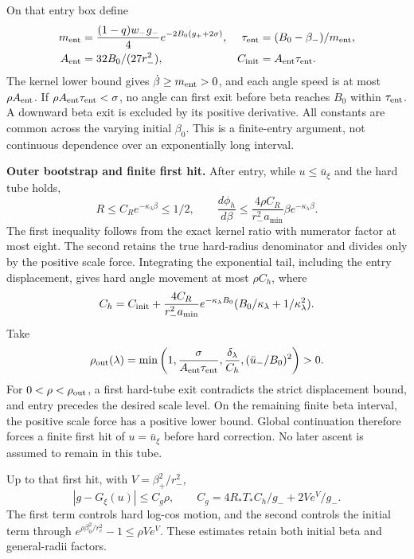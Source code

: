 \documentclass[11pt,a4paper]{article}
\begin{document}
On that entry box define
\[
\begin{aligned}
 m_{\rm ent}&=\frac{(1-q)w_-g_-}{4}e^{-2B_0(g_++2\sigma)},&
 \tau_{\rm ent}&=(B_0-\beta_-)/m_{\rm ent},\\
 A_{\rm ent}&=32B_0/(27r_-^2),& C_{\rm init}&=A_{\rm ent}\tau_{\rm ent}.
\end{aligned}
\]
The kernel lower bound gives $\dot\beta\ge m_{\rm ent}>0$, and each angle speed is at most $\rho A_{\rm ent}$. If $\rho A_{\rm ent}\tau_{\rm ent}<\sigma$, no angle can first exit before beta reaches $B_0$ within $\tau_{\rm ent}$. A downward beta exit is excluded by its positive derivative. All constants are common across the varying initial $\beta_0$. This is a finite-entry argument, not continuous dependence over an exponentially long interval.

\textbf{Outer bootstrap and finite first hit.} After entry, while $u\le\bar u_\xi$ and the hard tube holds,
\[
 R\le C_R e^{-\kappa_\lambda\beta}\le1/2,\qquad
 \frac{d\phi_h}{d\beta}\le
 \frac{4\rho C_R}{r_-^2a_{\min}}\beta e^{-\kappa_\lambda\beta}.
\]
The first inequality follows from the exact kernel ratio with numerator factor at most eight. The second retains the true hard-radius denominator and divides only by the positive scale force. Integrating the exponential tail, including the entry displacement, gives hard angle movement at most $\rho C_h$, where
\[
 C_h=C_{\rm init}+\frac{4C_R}{r_-^2a_{\min}}
 e^{-\kappa_\lambda B_0}(B_0/\kappa_\lambda+1/\kappa_\lambda^2).
\]
Take
\[
 \rho_{\rm out}(\lambda)=\min\left(1,
 \frac{\sigma}{A_{\rm ent}\tau_{\rm ent}},
 \frac{\delta_\lambda}{C_h},(\bar u_-/B_0)^2\right)>0 .
\]
For $0<\rho<\rho_{\rm out}$, a first hard-tube exit contradicts the strict displacement bound, and entry precedes the desired scale level. On the remaining finite beta interval, the positive scale force has a positive lower bound. Global continuation therefore forces a finite first hit of $u=\bar u_\xi$ before hard correction. No later ascent is assumed to remain in this tube.

Up to that first hit, with $V=\beta_+^2/r_-^2$,
\[
 |g-G_\xi(u)|\le C_g\rho,\qquad
 C_g=4R_*T_*C_h/g_-+2Ve^V/g_- .
\]
The first term controls hard log-cos motion, and the second controls the initial term through $e^{\rho\beta_0^2/r_e^2}-1\le\rho Ve^V$. These estimates retain both initial beta and general-radii factors.
\end{document}
